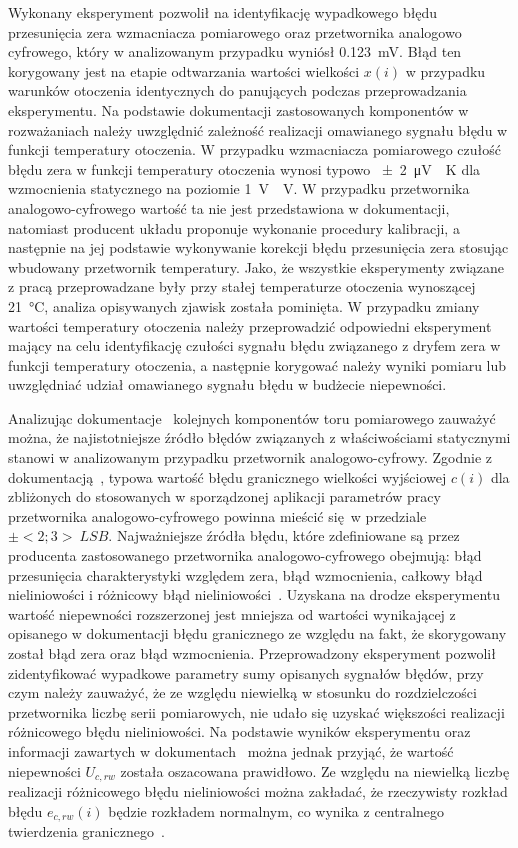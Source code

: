 Wykonany eksperyment pozwolił na identyfikację wypadkowego błędu przesunięcia zera wzmacniacza pomiarowego oraz przetwornika analogowo cyfrowego, który w analizowanym przypadku wyniósł \qty{0.123}{mV}. Błąd ten korygowany jest na etapie odtwarzania wartości wielkości $x(i)$ w przypadku warunków otoczenia identycznych do panujących podczas przeprowadzania eksperymentu. Na podstawie dokumentacji zastosowanych komponentów w rozważaniach należy uwzględnić zależność realizacji omawianego sygnału błędu w funkcji temperatury otoczenia. W przypadku wzmacniacza pomiarowego czułość błędu zera w funkcji temperatury otoczenia wynosi typowo \qty{\pm 2}{\micro V \per K} dla wzmocnienia statycznego na poziomie \qty{1}{V \per V}. W przypadku przetwornika analogowo-cyfrowego wartość ta nie jest przedstawiona w dokumentacji, natomiast producent układu proponuje wykonanie procedury kalibracji, a następnie na jej podstawie wykonywanie korekcji błędu przesunięcia zera stosując wbudowany przetwornik temperatury. Jako, że wszystkie eksperymenty związane z pracą przeprowadzane były przy stałej temperaturze otoczenia wynoszącej \qty{21}{\degreeCelsius}, analiza opisywanych zjawisk została pominięta. W przypadku zmiany wartości temperatury otoczenia należy przeprowadzić odpowiedni eksperyment mający na celu identyfikację czułości sygnału błędu związanego z dryfem zera w funkcji temperatury otoczenia, a następnie korygować należy wyniki pomiaru lub uwzględniać udział omawianego sygnału błędu w budżecie niepewności. 

Analizując dokumentacje~\cite{microchip_manual, stm_manual, diodes_manual, stm_f411} kolejnych komponentów toru pomiarowego zauważyć można, że najistotniejsze źródło błędów związanych z właściwościami statycznymi stanowi w analizowanym przypadku przetwornik analogowo-cyfrowy. Zgodnie z dokumentacją~\cite{stm_f411}, typowa wartość błędu granicznego wielkości wyjściowej $c(i)$ dla zbliżonych do stosowanych w sporządzonej aplikacji parametrów pracy przetwornika analogowo-cyfrowego powinna mieścić się w przedziale $\pm<2; 3>~\unit{LSB}$. Najważniejsze źródła błędu, które zdefiniowane są przez producenta zastosowanego przetwornika analogowo-cyfrowego obejmują: błąd przesunięcia charakterystyki względem zera, błąd wzmocnienia, całkowy błąd nieliniowości i różnicowy błąd nieliniowości~\cite{stm_adc, stm_f411}. Uzyskana na drodze eksperymentu wartość niepewności rozszerzonej jest mniejsza od wartości wynikającej z opisanego w dokumentacji błędu granicznego ze względu na fakt, że skorygowany został błąd zera oraz błąd wzmocnienia. Przeprowadzony eksperyment pozwolił zidentyfikować wypadkowe parametry sumy opisanych sygnałów błędów, przy czym należy zauważyć, że ze względu niewielką w stosunku do rozdzielczości przetwornika liczbę serii pomiarowych, nie udało się uzyskać większości realizacji różnicowego błędu nieliniowości. Na podstawie wyników eksperymentu oraz informacji zawartych w dokumentach~\cite{stm_f411, stm_adc} można jednak przyjąć, że wartość niepewności $U_{c,rw}$ została oszacowana prawidłowo. Ze względu na niewielką liczbę realizacji różnicowego błędu nieliniowości można zakładać, że rzeczywisty rozkład błędu $e_{c,rw}(i)$ będzie rozkładem normalnym, co wynika z centralnego twierdzenia granicznego~\cite{jcgm_guide}.

